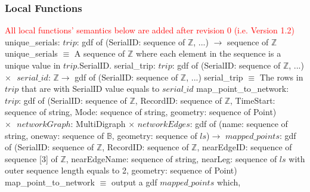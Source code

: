 \documentclass[12pt, titlepage]{article}
\begin{document}
\subsubsection{Local Functions}
\textcolor{red}{All local functions' semantics below are added after revision 0 (i.e. Version 1.2)}\newline\newline
unique\_serials: $trip$: gdf of (SerialID: sequence of $\mathbb{Z}$, ...) $\rightarrow$ sequence of $\mathbb{Z}$\newline
unique\_serials $\equiv$ A sequence of $\mathbb{Z}$ where each element in the sequence is a unique value in $trip$.SerialID.\newline\newline
serial\_trip: $trip$: gdf of (SerialID: sequence of $\mathbb{Z}$, ...) $\times \text{ }serial\_id$: $\mathbb{Z} \rightarrow$ gdf of (SerialID: sequence of $\mathbb{Z}$, ...)\newline
serial\_trip $\equiv$ The rows in $trip$ that are with SerialID value equals to $serial\_id$\newline\newline  
map\_point\_to\_network: \newline
$trip$: gdf of (SerialID: sequence of $\mathbb{Z}$, RecordID: sequence of $\mathbb{Z}$, TimeStart: sequence of string, Mode: sequence of string, geometry: sequence of Point) $\times \text{ }networkGraph$: MultiDigraph $\times$ $networkEdges$: gdf of (name: sequence of string, oneway: sequence of $\mathbb{B}$, geometry: sequence of $ls$)\newline $\rightarrow$ \newline 
$mapped\_points$: gdf of (SerialID: sequence of $\mathbb{Z}$, RecordID: sequence of $\mathbb{Z}$, nearEdgeID: sequence of sequence [3] of $\mathbb{Z}$, nearEdgeName: sequence of string, nearLeg: sequence of $ls$ with outer sequence length equals to 2, geometry: sequence of Point)\newline
map\_point\_to\_network $\equiv$ output a gdf $mapped\_points$ which, 
\end{document}

